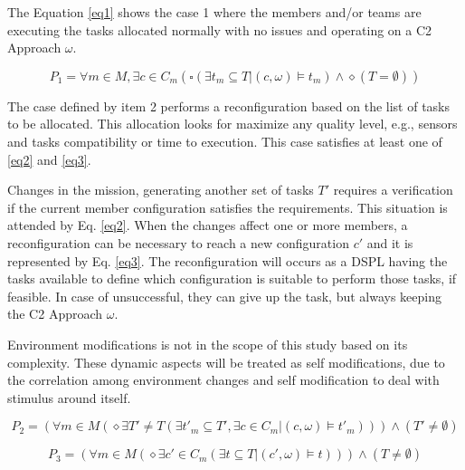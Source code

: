 The Equation \eqref{eq1} shows the case 1 where the members and/or teams are executing the tasks allocated normally with no issues and operating on a C2 Approach $\omega$.

\begin{equation}
\label{eq1}
 P_1 = \forall m \in M, \exists c \in C_m ( \square (\exists t_m \subseteq T | (c, \omega) \models t_m ) \land \diamond (T = \emptyset )) 
\end{equation}

The case defined by item 2 performs a reconfiguration based on the list of tasks to be allocated. This allocation looks for maximize any quality level, e.g., sensors and tasks compatibility or time to execution. This case satisfies at least one of \eqref{eq2} and \eqref{eq3}. 

Changes in the mission, generating another set of tasks $T'$ requires a verification if the current member configuration satisfies the requirements. This situation is attended by Eq. \eqref{eq2}. When the changes affect one or more members, a reconfiguration can be necessary to reach a new configuration $c'$ and it is represented by Eq. \eqref{eq3}. The reconfiguration will occurs as a DSPL having the tasks available to define which configuration is suitable to perform those tasks, if feasible. In case of unsuccessful, they can give up the task, but always keeping the C2 Approach $\omega$.

Environment modifications is not in the scope of this study based on its complexity. These dynamic aspects will be treated as self modifications, due to the correlation among environment changes and self modification to deal with stimulus around itself.



\begin{equation}
\label{eq2}
 P_2 = (\forall m \in M (\diamond \exists T' \ne T (\exists t'_m \subseteq T', \exists c \in C_m | (c, \omega) \models t'_m))) \land (T' \ne \emptyset)  
\end{equation}

\begin{equation}
\label{eq3}
 P_3 = (\forall m \in M (\diamond \exists c' \in C_m ( \exists t \subseteq T | (c',\omega) \models t))) \land (T \ne \emptyset)  
\end{equation}

